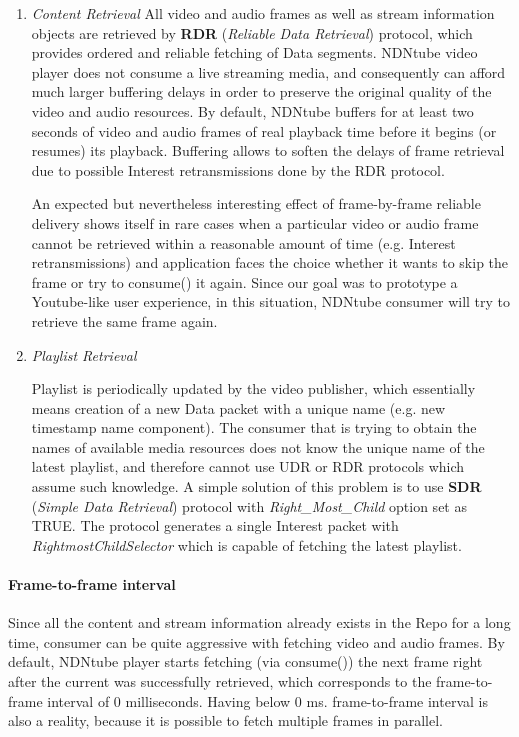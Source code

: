 \begin{enumerate}
	\item {\textit{Content Retrieval}}
All video and audio frames as well as stream information objects are retrieved by \textbf{RDR} (\textit{Reliable Data Retrieval}) protocol, which provides ordered and reliable fetching of Data segments. NDNtube video player does not consume a live streaming media, and consequently can afford much larger buffering delays in order to preserve the original quality of the video and audio resources. By default, NDNtube buffers for at least two seconds of video and audio frames of real playback time before it begins (or resumes) its playback. Buffering allows to soften the delays of frame retrieval due to possible Interest retransmissions done by the RDR protocol. 

An expected but nevertheless interesting effect of frame-by-frame reliable delivery shows itself in rare cases when a particular video or audio frame cannot be retrieved within a reasonable amount of time (e.g. Interest retransmissions) and application faces the choice whether it wants to skip the frame or try to consume() it again. Since our goal was to prototype a Youtube-like user experience, in this situation, NDNtube consumer will try to retrieve the same frame again. 

	\item {\textit{Playlist Retrieval}} 
	
Playlist is periodically updated by the video publisher, which essentially means creation of a new Data packet with a unique name (e.g. new timestamp name component). The consumer that is trying to obtain the names of available media resources does not know the unique name of the latest playlist, and therefore cannot use UDR or RDR protocols which assume such knowledge. A simple solution of this problem is to use  \textbf{SDR} (\textit{Simple Data Retrieval}) protocol with \textit{Right\_Most\_Child} option set as TRUE. The protocol generates a single Interest packet with \textit{RightmostChildSelector} which is capable of fetching the latest playlist. 

\end{enumerate}

\paragraph{Frame-to-frame interval} 

Since all the content and stream information already exists in the Repo for a long time, consumer can be quite aggressive with fetching video and audio frames. By default, NDNtube player starts fetching (via consume()) the next frame right after the current was successfully retrieved, which corresponds to the frame-to-frame interval of 0 milliseconds. Having below 0 ms. frame-to-frame interval is also a reality, because it is possible to fetch multiple frames in parallel.

